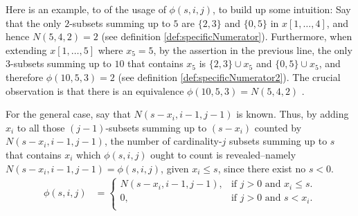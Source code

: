 \documentclass[a4paper]{article}
\begin{document}

Here is an example, to of the usage of $\phi (s,i,j)$, to build up some intuition: Say that the only $2$-subsets summing up to $5$ are $\{2,3\}$ and $\{0,5\}$ in $x[1,\ldots,4]$, and hence $N(5,4,2)=2$ (see definition \ref{def:specificNumerator}). Furthermore, when extending $x[1,\ldots,5]$ where $x_{5}=5$, by the assertion in the previous line, the only $3$-subsets summing up to $10$ that contains $x_{5}$ is $\{2,3\} \cup {x_{5}}$ and $\{0,5\} \cup {x_{5}}$, and therefore $\phi (10,5,3)=2$ (see definition \ref{def:specificNumerator2}). The crucial observation is that there is an equivalence $\phi (10,5,3)=N(5,4,2)$ .

For the general case, say that $N(s - x_{i},i-1,j-1)$ is known. Thus, by adding $x_{i}$ to all those $(j-1)$-subsets summing up to $(s - x_{i})$ counted by $N(s - x_{i},i-1,j-1)$, the number of cardinality-$j$ subsets summing up to $s$ that contains $x_{i}$ which $\phi (s,i,j)$ ought to count is revealed–namely $N(s - x_{i},i-1,j-1)=\phi (s,i,j)$, given $x_{i} \leq s$, since there exist no $s<0$.
\begin{align}
\label{eq:cond4}
\phi (s,i,j) &=\begin{cases}
    N(s - x_{i},i-1,j-1), & \text{if $j>0$ and $x_{i} \leq s$}.\\
    0, & \text{if $j>0$ and $s < x_{i}$}.\\
  \end{cases}
\end{align}
\end{document}
